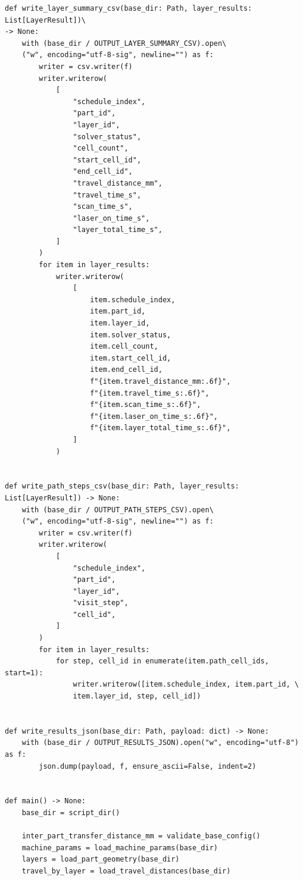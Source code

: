 \documentclass[a4paper, 12pt]{ctexart}
\begin{document}
\begin{verbatim}
def write_layer_summary_csv(base_dir: Path, layer_results: List[LayerResult])\
-> None:
    with (base_dir / OUTPUT_LAYER_SUMMARY_CSV).open\
    ("w", encoding="utf-8-sig", newline="") as f:
        writer = csv.writer(f)
        writer.writerow(
            [
                "schedule_index",
                "part_id",
                "layer_id",
                "solver_status",
                "cell_count",
                "start_cell_id",
                "end_cell_id",
                "travel_distance_mm",
                "travel_time_s",
                "scan_time_s",
                "laser_on_time_s",
                "layer_total_time_s",
            ]
        )
        for item in layer_results:
            writer.writerow(
                [
                    item.schedule_index,
                    item.part_id,
                    item.layer_id,
                    item.solver_status,
                    item.cell_count,
                    item.start_cell_id,
                    item.end_cell_id,
                    f"{item.travel_distance_mm:.6f}",
                    f"{item.travel_time_s:.6f}",
                    f"{item.scan_time_s:.6f}",
                    f"{item.laser_on_time_s:.6f}",
                    f"{item.layer_total_time_s:.6f}",
                ]
            )


def write_path_steps_csv(base_dir: Path, layer_results: List[LayerResult]) -> None:
    with (base_dir / OUTPUT_PATH_STEPS_CSV).open\
    ("w", encoding="utf-8-sig", newline="") as f:
        writer = csv.writer(f)
        writer.writerow(
            [
                "schedule_index",
                "part_id",
                "layer_id",
                "visit_step",
                "cell_id",
            ]
        )
        for item in layer_results:
            for step, cell_id in enumerate(item.path_cell_ids, start=1):
                writer.writerow([item.schedule_index, item.part_id, \
                item.layer_id, step, cell_id])


def write_results_json(base_dir: Path, payload: dict) -> None:
    with (base_dir / OUTPUT_RESULTS_JSON).open("w", encoding="utf-8") as f:
        json.dump(payload, f, ensure_ascii=False, indent=2)


def main() -> None:
    base_dir = script_dir()

    inter_part_transfer_distance_mm = validate_base_config()
    machine_params = load_machine_params(base_dir)
    layers = load_part_geometry(base_dir)
    travel_by_layer = load_travel_distances(base_dir)


\end{verbatim}
\end{document}
